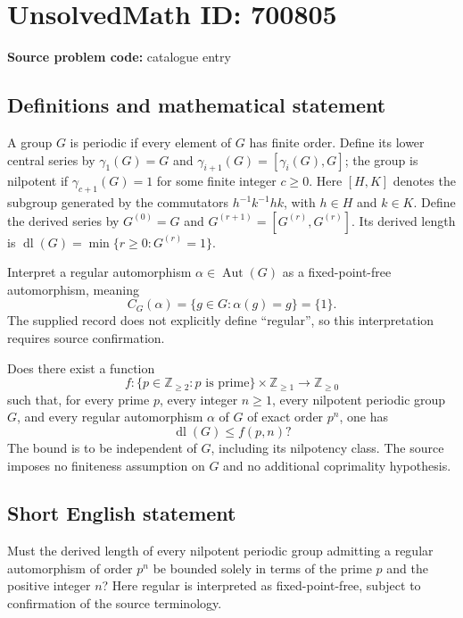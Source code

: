 \documentclass[11pt]{article}
\newcommand{\Z}{\mathbb{Z}}
\begin{document}
\section*{UnsolvedMath ID: 700805}
\textbf{Source problem code:} catalogue entry
\subsection{Definitions and mathematical statement}
A group \(G\) is periodic if every element of \(G\) has finite order. Define its lower central series by \(\gamma_1(G)=G\) and \(\gamma_{i+1}(G)=[\gamma_i(G),G]\); the group is nilpotent if \(\gamma_{c+1}(G)=1\) for some finite integer \(c\geq 0\). Here \([H,K]\) denotes the subgroup generated by the commutators \(h^{-1}k^{-1}hk\), with \(h\in H\) and \(k\in K\). Define the derived series by \(G^{(0)}=G\) and \(G^{(r+1)}=[G^{(r)},G^{(r)}]\). Its derived length is \(\operatorname{dl}(G)=\min\{r\geq 0:G^{(r)}=1\}\).

Interpret a regular automorphism \(\alpha\in\operatorname{Aut}(G)\) as a fixed-point-free automorphism, meaning
\[
C_G(\alpha)=\{g\in G:\alpha(g)=g\}=\{1\}.
\]
The supplied record does not explicitly define ``regular'', so this interpretation requires source confirmation.

Does there exist a function
\[
f:\{p\in\Z_{\geq 2}:p\text{ is prime}\}\times\Z_{\geq 1}\longrightarrow\Z_{\geq 0}
\]
such that, for every prime \(p\), every integer \(n\geq 1\), every nilpotent periodic group \(G\), and every regular automorphism \(\alpha\) of \(G\) of exact order \(p^n\), one has
\[
\operatorname{dl}(G)\leq f(p,n)?
\]
The bound is to be independent of \(G\), including its nilpotency class. The source imposes no finiteness assumption on \(G\) and no additional coprimality hypothesis.
\subsection{Short English statement}
Must the derived length of every nilpotent periodic group admitting a regular automorphism of order \(p^n\) be bounded solely in terms of the prime \(p\) and the positive integer \(n\)? Here regular is interpreted as fixed-point-free, subject to confirmation of the source terminology.
\end{document}
